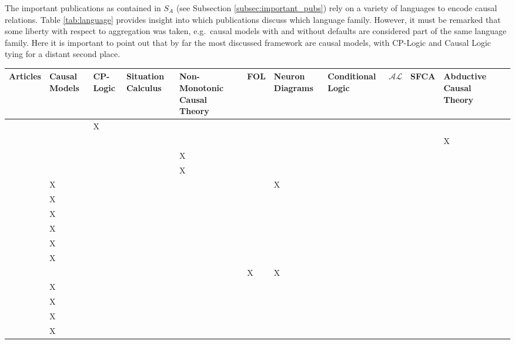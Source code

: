 \documentclass[11pt,a4paper]{book}
\theoremstyle{definition}
\theoremstyle{definition}
\theoremstyle{definition}
\theoremstyle{remark}
\newcommand{\prset}{S_{A}}
\begin{document}
The important publications as contained in $\prset$ (see Subsection \ref{subsec:important_pubs}) rely on a variety of languages to encode causal relations. Table \ref{tab:language} provides insight into which publications discuss which language family.
However, it must be remarked that some liberty with respect to aggregation was taken, e.g.\ causal models with and without defaults are considered part of the same language family. 
Here it is important to point out that by far the most discussed framework are causal models, with CP-Logic and Causal Logic tying for a distant second place. 


\begin{table}
\centering
\tiny
\begin{tabular}{lp{1cm}p{1cm}p{1cm}p{1cm}p{1cm}p{1cm}p{1.1cm}p{1cm}p{1cm}p{1cm}p{1cm}}
\toprule
Articles & Causal Models	& CP-Logic	& Situation Calculus	&  Non-Monotonic Causal Theory & FOL & Neuron Diagrams & 	Conditional Logic	& $\mathcal{AL}$	& SFCA &  Abductive Causal Theory \\   
\midrule        
\cite{vennekens2010embracing} 	& 	& X	& 	& 	& 	& 	& 	& 	& 	& 	\\
 \cite{bex2010hybrid} 	& 	& 	& 	& 	& 	& 	& 	& 	& 	& X	\\
 \cite{lee2010representing}	& 	& 	& 	& X	& 	& 	& 	& 	& 	& 	\\
 \cite{lifschitz2010translating} 	& 	& 	& 	& X	& 	& 	& 	& 	& 	& 	\\
 \cite{glymour2010actual}	& X	& 	& 	& 	& 	& X	& 	& 	& 	& 	\\
 \cite{claassen2010causal} 	& X	& 	& 	& 	& 	& 	& 	& 	& 	& 	\\
 \cite{gerstenberg2010spreading}	& X	& 	& 	& 	& 	& 	& 	& 	& 	& 	\\
 \cite{halpern2011actual} 	& X	& 	& 	& 	& 	& 	& 	& 	& 	& 	\\
 \cite{shulz2011if} 	& X	& 	& 	& 	& 	& 	& 	& 	& 	& 	\\
 \cite{briggs2012interventionist}	& X	& 	& 	& 	& 	& 	& 	& 	& 	& 	\\
 \cite{baumgartner2013regularity} 	& 	& 	& 	& 	& X	& X	& 	& 	& 	& 	\\
 \cite{hyttinen2013discovering} 	& X	& 	& 	& 	& 	& 	& 	& 	& 	& 	\\
 \cite{halpern2015graded} 	& X	& 	& 	& 	& 	& 	& 	& 	& 	& 	\\
 \cite{weslake2015partial} 	& X	& 	& 	& 	& 	& 	& 	& 	& 	& 	\\
 \cite{chockler2015causal}  	& X	& 	& 	& 	& 	& 	& 	& 	& 	& 	\\

\end{tabular}
\end{table}
\end{document}
